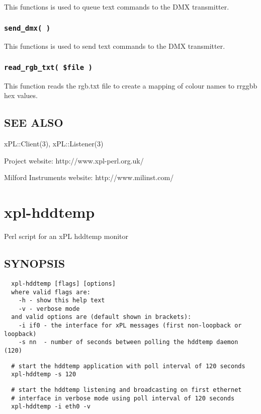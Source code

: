 This functions is used to queue text commands to the DMX transmitter.

\subsubsection*{\texttt{send\_dmx( )}\label{xpl-dmx_send_dmx_}}


This functions is used to send text commands to the DMX transmitter.

\subsubsection*{\texttt{read\_rgb\_txt( \$file )}\label{xpl-dmx_read_rgb_txt_file_}}


This function reads the rgb.txt file to create a mapping of colour names
to rrggbb hex values.

\subsection*{SEE ALSO\label{xpl-dmx_SEE_ALSO}}


xPL::Client(3), xPL::Listener(3)



Project website: http://www.xpl-perl.org.uk/



Milford Instruments website: http://www.milinst.com/

\section{xpl-hddtemp\label{xpl-hddtemp}}


Perl script for an xPL hddtemp monitor

\subsection*{SYNOPSIS\label{xpl-hddtemp_SYNOPSIS}}
\begin{verbatim}
  xpl-hddtemp [flags] [options]
  where valid flags are:
    -h - show this help text
    -v - verbose mode
  and valid options are (default shown in brackets):
    -i if0 - the interface for xPL messages (first non-loopback or loopback)
    -s nn  - number of seconds between polling the hddtemp daemon (120)
\end{verbatim}
\begin{verbatim}
  # start the hddtemp application with poll interval of 120 seconds
  xpl-hddtemp -s 120
\end{verbatim}
\begin{verbatim}
  # start the hddtemp listening and broadcasting on first ethernet
  # interface in verbose mode using poll interval of 120 seconds
  xpl-hddtemp -i eth0 -v
\end{verbatim}
